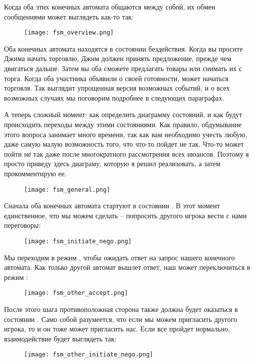 Когда оба этих конечных автомата общаются между собой, их обмен сообщениями может выглядеть как-то так:
\begin{figure}[H]
    \centering
    \texttt{[image: fsm\_overview.png]}
\end{figure}

Оба конечных автомата находятся в состоянии бездействия.
Когда вы просите Джима начать торговлю, Джим должен принять предложение, прежде чем двигаться дальше.
Затем вы оба сможете предлагать товары или снимать их с торга.
Когда оба участника объявили о своей готовности, может начаться торговля.
Так выглядит упрощенная версия возможных событий, и о всех возможных случаях мы поговорим подробнее в следующих параграфах.

А теперь сложный момент: как определить диаграмму состояний, и как будут происходить переходы между этими состояниями.
Как правило, обдумывание этого вопроса занимает много времени, так как вам необходимо учесть любую, даже самую малую возможность того, что что-то пойдет не так.
Что-то может пойти не так даже после многократного рассмотрения всех нюансов.
Поэтому я просто приведу здесь диаграму, которую я решил реализовать, а затем прокомментирую ее.
\begin{figure}[H]
    \centering
    \texttt{[image: fsm\_general.png]}
\end{figure}

Сначала оба конечных автомата стартуют в состоянии .
В этот момент единственное, что мы можем сделать \--- попросить другого игрока вести с нами переговоры:
\begin{figure}[H]
    \centering
    \texttt{[image: fsm\_initiate\_nego.png]}
\end{figure}

Мы переходим в режим , чтобы ожидать ответ на запрос нашего конечного автомата.
Как только другой автомат вышлет ответ, наш может переключиться в режим :
\begin{figure}[H]
    \centering
    \texttt{[image: fsm\_other\_accept.png]}
\end{figure}

После этого шага противоположная сторона также должна будет оказаться в состоянии .
Само собой разумеется, что если мы можем пригласить другого игрока, то и он тоже может пригласить нас.
Если все пройдет нормально, взаимодействие будет выглядеть так:
\begin{figure}[H]
    \centering
    \texttt{[image: fsm\_other\_initiate\_nego.png]}
\end{figure}

